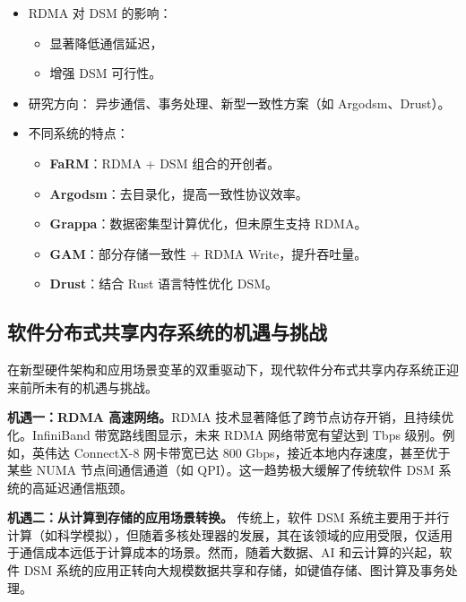 {\begin{enumerate}[leftmargin=1em, align=left]
          \begin{itemize}
            \item RDMA 对 DSM 的影响：
                  \begin{itemize}
                    \item 显著降低通信延迟，
                    \item 增强 DSM 可行性。
                  \end{itemize}
            \item 研究方向：
                  异步通信、事务处理、新型一致性方案（如 Argodsm、Drust）。
            \item 不同系统的特点：
                  \begin{itemize}
                    \item \textbf{FaRM}：RDMA + DSM 组合的开创者。
                    \item \textbf{Argodsm}：去目录化，提高一致性协议效率。
                    \item \textbf{Grappa}：数据密集型计算优化，但未原生支持 RDMA。
                    \item \textbf{GAM}：部分存储一致性 + RDMA Write，提升吞吐量。
                    \item \textbf{Drust}：结合 Rust 语言特性优化 DSM。
                  \end{itemize}
          \end{itemize}
  \end{enumerate}

  \subsection{软件分布式共享内存系统的机遇与挑战}
  在新型硬件架构和应用场景变革的双重驱动下，现代软件分布式共享内存系统正迎来前所未有的机遇与挑战。

  \textbf{机遇一：RDMA 高速网络。}RDMA 技术显著降低了跨节点访存开销，且持续优化。InfiniBand 带宽路线图显示，未来 RDMA 网络带宽有望达到 Tbps 级别。例如，英伟达 ConnectX-8 网卡带宽已达 800 Gbps，接近本地内存速度，甚至优于某些 NUMA 节点间通信通道（如 QPI）。这一趋势极大缓解了传统软件 DSM 系统的高延迟通信瓶颈。

  \textbf{机遇二：从计算到存储的应用场景转换。} 传统上，软件 DSM 系统主要用于并行计算（如科学模拟），但随着多核处理器的发展，其在该领域的应用受限，仅适用于通信成本远低于计算成本的场景。然而，随着大数据、AI 和云计算的兴起，软件 DSM 系统的应用正转向大规模数据共享和存储，如键值存储、图计算及事务处理。

}
